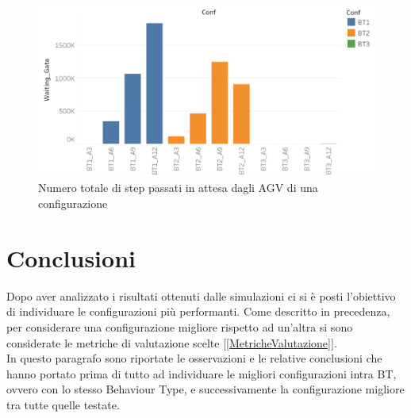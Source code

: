 \documentclass[12pt]{article}
\begin{document}
\begin{figure}[H]
\centering
  \includegraphics[width=1\linewidth]{Figures/Results_Graphics/Waiting_Total.png}
  \caption{Numero totale di step passati in attesa dagli AGV di una configurazione}\label{fig:waiting_total}
\end{figure}


\newpage
\section{Conclusioni}
Dopo aver analizzato i risultati ottenuti dalle simulazioni ci si è posti l'obiettivo di individuare le configurazioni più performanti. Come descritto in precedenza, per considerare una configurazione migliore rispetto ad un'altra si sono considerate le metriche di valutazione scelte  [\ref{MetricheValutazione}]. \\
In questo paragrafo sono riportate le osservazioni e le relative conclusioni che hanno portato prima di tutto ad individuare le migliori configurazioni intra BT, ovvero con lo stesso Behaviour Type, e successivamente la configurazione migliore tra tutte quelle testate.
\end{document}
